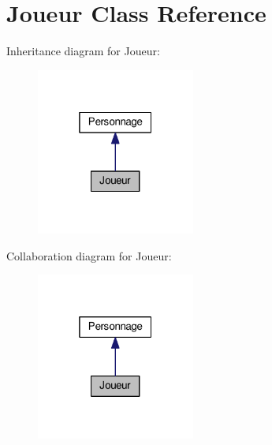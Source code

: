 \hypertarget{class_joueur}{}\section{Joueur Class Reference}
\label{class_joueur}


Inheritance diagram for Joueur\+:
\nopagebreak
\begin{figure}[H]
\begin{center}
\leavevmode
\includegraphics[width=148pt]{class_joueur__inherit__graph}
\end{center}
\end{figure}


Collaboration diagram for Joueur\+:
\nopagebreak
\begin{figure}[H]
\begin{center}
\leavevmode
\includegraphics[width=148pt]{class_joueur__coll__graph}
\end{center}
\end{figure}
